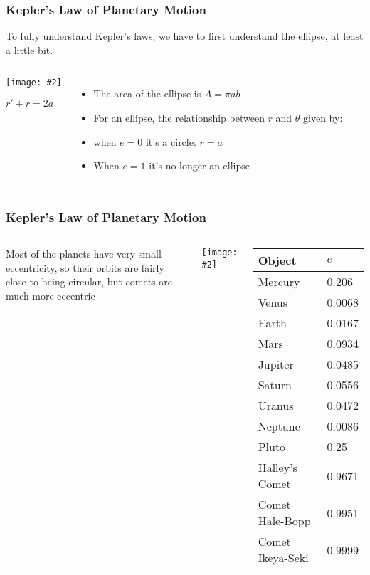 \documentclass[12pt,compress,aspectratio=169]{beamer}
\newcommand{\pic}[2]{\texttt{[image: \#2]}}
\newcommand{\eq}[2]{\vspace{#1}{\Large\begin{displaymath}#2\end{displaymath}}}
\begin{document}
\begin{frame}
  \frametitle{Kepler's Law of Planetary Motion}
  To fully understand Kepler's laws, we have to first understand the ellipse,
  at least a little bit.

  \begin{columns}
    \begin{center}
      \pic{1.25}{elliporb.png}
      
      $r' + r =2a$
    \end{center}

    \begin{itemize}
    \item The area of the ellipse is $A=\pi ab$
    \item For an ellipse, the relationship between $r$ and $\theta$ given by:

      \eq{-.35in}{
        r=\frac{a(1-e^2)}{1+e\cos\theta}
        \quad\textnormal{\normalsize where}\quad
        0\leq e < 1
      }
    \item when $e=0$ it's a circle: $r=a$
    \item When $e=1$ it's no longer an ellipse
    \end{itemize}
  \end{columns}
\end{frame}


\begin{frame}
  \frametitle{Kepler's Law of Planetary Motion}
  \begin{columns}
    Most of the planets have very small eccentricity, so their orbits are
    fairly close to being circular, but comets are much more eccentric
    \begin{center}
      \pic{.7}{kep5.png}
    \end{center}
    
    \begin{tabular}{l|l}
      \rowcolor{pink}
      \textbf{Object} & $e$ \\ \hline
      Mercury	& \num{.206} \\
      Venus	& \num{.0068} \\
      Earth	& \num{.0167} \\
      Mars	& \num{.0934} \\
      Jupiter	& \num{.0485} \\
      Saturn	& \num{.0556} \\
      Uranus	& \num{.0472} \\
      Neptune	& \num{.0086} \\
      Pluto	& \num{.25} \\ \hline
      Halley's Comet   & \num{.9671} \\
      Comet Hale-Bopp  & \num{.9951} \\
      Comet Ikeya-Seki & \num{.9999}
    \end{tabular}
  \end{columns}
\end{frame}
\end{document}
